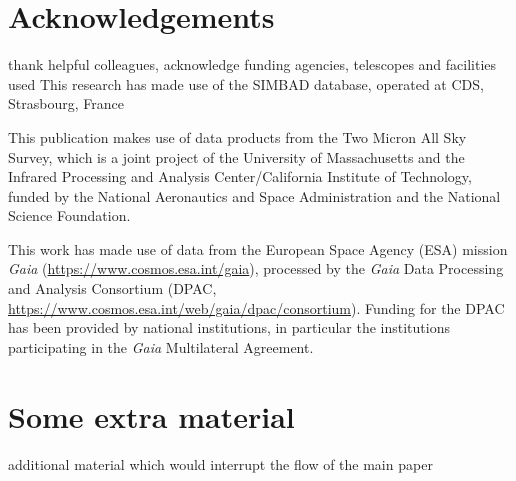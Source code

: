 \documentclass[fleqn,usenatbib,letters]{mnras}%
\begin{document}
\section*{Acknowledgements}

thank helpful colleagues, acknowledge funding agencies, telescopes and facilities used
This research has made use of the SIMBAD database,
operated at CDS, Strasbourg, France~\citep{wenger2000}

This publication makes use of data products from the Two Micron All Sky Survey, which is a joint project of the University of Massachusetts and the Infrared Processing and Analysis Center/California Institute of Technology, funded by the National Aeronautics and Space Administration and the National Science Foundation.

This work has made use of data from the European Space Agency (ESA) mission {\it Gaia} (\url{https://www.cosmos.esa.int/gaia}), processed by the {\it Gaia} Data Processing and Analysis Consortium (DPAC, \url{https://www.cosmos.esa.int/web/gaia/dpac/consortium}). Funding for the DPAC has been provided by national institutions, in particular the institutions participating in the {\it Gaia} Multilateral Agreement.










\appendix

\section{Some extra material}

additional material which would interrupt the flow of the main paper




\bsp	%
\label{lastpage}
\end{document}

